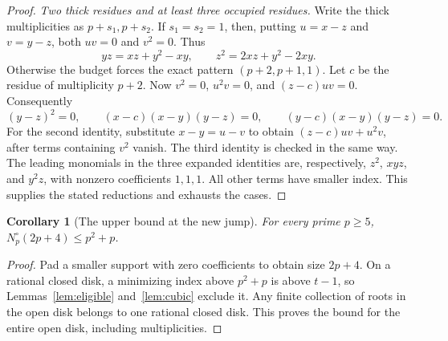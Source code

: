 \documentclass[11pt]{article}
\newtheorem{corollary}[theorem]{Corollary}
\theoremstyle{remark}\newtheorem{remark}[theorem]{Remark}
\begin{document}
\begin{proof}
\emph{Two thick residues and at least three occupied residues.} Write the thick multiplicities as $p+s_1,p+s_2$. If $s_1=s_2=1$, then, putting $u=x-z$ and $v=y-z$, both $uv=0$ and $v^2=0$. Thus
\begin{equation}\label{eq:two-thin}
 yz=xz+y^2-xy,\qquad z^2=2xz+y^2-2xy.
\end{equation}
Otherwise the budget forces the exact pattern $(p+2,p+1,1)$. Let $c$ be the residue of multiplicity $p+2$. Now $v^2=0$, $u^2v=0$, and $(z-c)uv=0$. Consequently
\begin{equation}\label{eq:three-relations}
 (y-z)^2=0,\qquad
 (x-c)(x-y)(y-z)=0,\qquad
 (y-c)(x-y)(y-z)=0.
\end{equation}
For the second identity, substitute $x-y=u-v$ to obtain $(z-c)uv+u^2v$, after terms containing $v^2$ vanish. The third identity is checked in the same way. The leading monomials in the three expanded identities are, respectively, $z^2$, $xyz$, and $y^2z$, with nonzero coefficients $1,1,1$. All other terms have smaller index. This supplies the stated reductions and exhausts the cases.
\end{proof}

\begin{corollary}[The upper bound at the new jump]\label{cor:upperjump}
For every prime $p\ge5$, $N_p^\circ(2p+4)\le p^2+p$.
\end{corollary}
\begin{proof}
Pad a smaller support with zero coefficients to obtain size $2p+4$. On a rational closed disk, a minimizing index above $p^2+p$ is above $t-1$, so Lemmas~\ref{lem:eligible} and~\ref{lem:cubic} exclude it. Any finite collection of roots in the open disk belongs to one rational closed disk. This proves the bound for the entire open disk, including multiplicities.
\end{proof}
\end{document}
